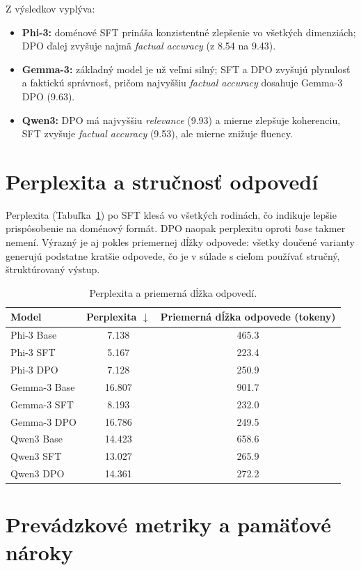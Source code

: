 Z výsledkov vyplýva:
\begin{itemize}
    \item \textbf{Phi-3:} doménové SFT prináša konzistentné zlepšenie vo všetkých dimenziách; DPO ďalej zvyšuje najmä \emph{factual accuracy} (z 8.54 na 9.43).
    \item \textbf{Gemma-3:} základný model je už veľmi silný; SFT a DPO zvyšujú plynulosť a faktickú správnosť, pričom najvyššiu \emph{factual accuracy} dosahuje Gemma-3 DPO (9.63).
    \item \textbf{Qwen3:} DPO má najvyššiu \emph{relevance} (9.93) a mierne zlepšuje koherenciu, SFT zvyšuje \emph{factual accuracy} (9.53), ale mierne znižuje fluency.
\end{itemize}

\section{Perplexita a stručnosť odpovedí}

Perplexita (Tabuľka~\ref{tab:ppl}) po SFT klesá vo všetkých rodinách, čo indikuje lepšie prispôsobenie na doménový formát. DPO naopak perplexitu oproti \emph{base} takmer nemení. Výrazný je aj pokles priemernej dĺžky odpovede: všetky doučené varianty generujú podstatne kratšie odpovede, čo je v súlade s cieľom používať stručný, štruktúrovaný výstup.

\begin{table}[h]
\centering
\small
\begin{tabular}{lcc}
\hline
Model & Perplexita $\downarrow$ & Priemerná dĺžka odpovede (tokeny) \\
\hline
Phi-3 Base & 7.138 & 465.3 \\
Phi-3 SFT & 5.167 & 223.4 \\
Phi-3 DPO & 7.128 & 250.9 \\
Gemma-3 Base & 16.807 & 901.7 \\
Gemma-3 SFT & 8.193 & 232.0 \\
Gemma-3 DPO & 16.786 & 249.5 \\
Qwen3 Base & 14.423 & 658.6 \\
Qwen3 SFT & 13.027 & 265.9 \\
Qwen3 DPO & 14.361 & 272.2 \\
\hline
\end{tabular}
\caption{Perplexita a priemerná dĺžka odpovedí.}
\label{tab:ppl}
\end{table}

\section{Prevádzkové metriky a pamäťové nároky}

